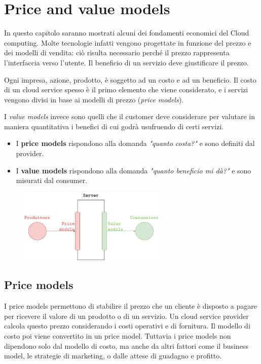\chapter{Price and value models}
In questo capitolo saranno mostrati alcuni dei fondamenti economici del Cloud computing. Molte tecnologie infatti vengono progettate in funzione del prezzo e dei modelli di vendita: ciò risulta necessario perché il prezzo rappresenta l'interfaccia verso l'utente. Il beneficio di un servizio deve giustificare il prezzo.

Ogni impresa, azione, prodotto, è soggetto ad un costo e ad un beneficio. Il costo di un cloud service spesso è il primo elemento che viene considerato, e i servizi vengono divisi in base ai modelli di prezzo (\textit{price models}).

\vspace{5mm}

I \textit{value models} invece sono quelli che il customer deve considerare per valutare in maniera quantitativa i benefici di cui godrà usufruendo di certi servizi.

\begin{mdframed}[backgroundcolor=gray!20,shadow=false]
\begin{itemize}
    \item I \textbf{price models} rispondono alla domanda \textit{"quanto costa?"} e sono definiti dal provider.
    \item I \textbf{value models} rispondono alla domanda \textit{"quanto beneficio mi dà?"} e sono misurati dal consumer.
\end{itemize}
\end{mdframed}

\begin{figure}[ht]
    \centering
    \includegraphics[width=7cm]{./Images/cap6/6.1.png}
\end{figure}

\section{Price models}
I price models permettono di stabilire il prezzo che un cliente è disposto a pagare per ricevere il valore di un prodotto o di un servizio. Un cloud service provider calcola questo prezzo considerando i costi operativi e di fornitura. Il modello di costo poi viene convertito in un price model. Tuttavia i price models non dipendono solo dal modello di costo, ma anche da altri fattori come il business model, le strategie di marketing, o dalle attese di guadagno e profitto.

